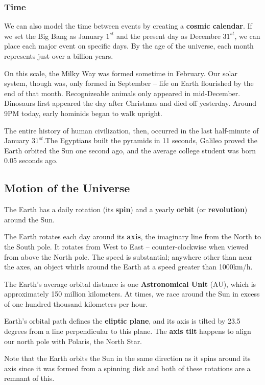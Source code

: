 \documentclass[12pt]{article}
\begin{document}
\subsubsection{Time}
We can also model the time between events by creating a {\bf cosmic calendar}. If we set the Big Bang as January $1^{st}$ and the present day as Decembre $31^{st}$, we can place each major event on specific days. By the age of the universe, each month represents just over a billion years.

On this scale, the Milky Way was formed sometime in February. Our solar system, though was, only formed in September -- life on Earth flourished by the end of that month. Recognizeable animals only appeared in mid-December. Dinosaurs first appeared the day after Christmas and died off yesterday. Around 9PM today, early hominids began to walk upright.

The entire history of human civilization, then, occurred in the last half-minute of January $31^{st}$.The Egyptians built the pyramids in 11 seconds, Galileo proved the Earth orbited the Sun one second ago, and the average college student was born 0.05 seconds ago.

\subsection{Motion of the Universe}
The Earth has a daily rotation (its {\bf spin}) and a yearly {\bf orbit} (or {\bf revolution}) around the Sun.

The Earth rotates each day around its {\bf axis}, the imaginary line from the North to the South pole. It rotates from West to East -- counter-clockwise when viewed from above the North pole. The speed is substantial; anywhere other than near the axes, an object whirls around the Earth at a speed greater than 1000km/h.

The Earth's average orbital distance is one {\bf Astronomical Unit} (AU), which is approximately 150 million kilometers. At times, we race around the Sun in excess of one hundred thousand kilometers per hour.

Earth's orbital path defines the {\bf eliptic plane}, and its axis is tilted by 23.5 degrees from a line perpendicular to this plane. The {\bf axis tilt} happens to align our north pole with Polaris, the North Star.

Note that the Earth orbits the Sun in the same direction as it spins around its axis since it was formed from a spinning disk and both of these rotations are a remnant of this.
\end{document}
